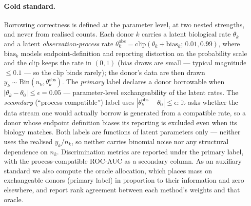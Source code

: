 \documentclass[11pt]{article}
\begin{document}
\paragraph{Gold standard.} Borrowing correctness is defined at the parameter
level, at two nested strengths, and never from realised counts. Each donor $k$
carries a latent biological rate $\theta_k$ and a latent
\emph{observation-process} rate $\theta^{\mathrm{obs}}_k =
\mathrm{clip}(\theta_k + \mathrm{bias}_k;\, 0.01, 0.99)$, where
$\mathrm{bias}_k$ models endpoint-definition and
reporting distortion on the probability scale and the clip keeps the rate in
$(0,1)$ (bias draws are small --- typical magnitude $\le 0.1$ --- so the clip
binds rarely); the donor's data are then drawn
$y_k \sim \mathrm{Bin}(n_k, \theta^{\mathrm{obs}}_k)$. The \emph{primary} label
declares a donor borrowable when $|\theta_k - \theta_0| \le \epsilon = 0.05$
--- parameter-level exchangeability of the latent rates. The \emph{secondary}
(``process-compatible'') label uses $|\theta^{\mathrm{obs}}_k - \theta_0| \le
\epsilon$: it asks whether the data stream one would actually borrow is
generated from a compatible rate, so a donor whose endpoint definition biases
its reporting is excluded even when its biology matches. Both labels are
functions of latent parameters only --- neither uses the realised $y_k/n_k$,
so neither carries binomial noise nor any structural dependence on $n_k$.
Discrimination metrics are reported under the primary label, with the
process-compatible ROC-AUC as a secondary column. As an auxiliary standard we
also compute the oracle allocation, which places mass on exchangeable donors
(primary label) in proportion to their information and zero elsewhere, and
report rank agreement between each method's weights and that oracle.
\end{document}
